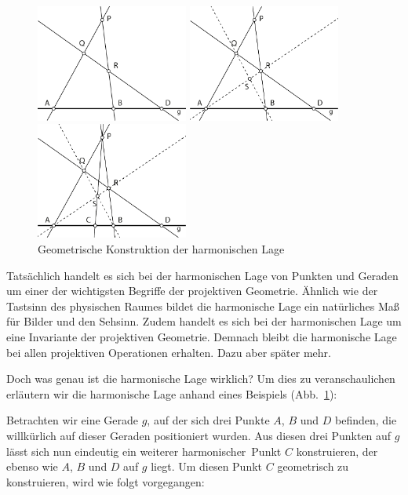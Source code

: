 \documentclass[12pt,a4paper]{article}
\begin{document}
\begin{figure}
\centering
\includegraphics[width=5cm]{Bilder/herleitung1.png}

\vspace{0.5cm}
\centering
\includegraphics[width=5cm]{Bilder/herleitung2.png}

\vspace{0.5cm}
\centering
\includegraphics[width=5cm]{Bilder/herleitung3.png}
\caption{Geometrische Konstruktion der harmonischen Lage}
\label{fig:Herleitung}
\end{figure}

Tatsächlich handelt es sich bei der harmonischen Lage von Punkten und Geraden um einer der wichtigsten Begriffe der projektiven Geometrie. Ähnlich wie der Tastsinn des physischen Raumes bildet die harmonische Lage ein natürliches Maß für Bilder und den Sehsinn. Zudem handelt es sich bei der harmonischen Lage um eine Invariante der projektiven Geometrie. Demnach bleibt die harmonische Lage bei allen projektiven Operationen erhalten. Dazu aber später mehr.

Doch was genau ist die harmonische Lage wirklich? Um dies zu veranschaulichen erläutern wir die harmonische Lage anhand eines Beispiels (Abb.~\ref{fig:Herleitung}):

Betrachten wir eine Gerade $g$, auf der sich drei Punkte $A$, $B$ und $D$ befinden, die willkürlich auf dieser Geraden positioniert wurden. Aus diesen drei Punkten auf $g$ lässt sich nun eindeutig ein weiterer \glqq harmonischer\grqq ~Punkt $C$ konstruieren, der ebenso wie $A$, $B$ und $D$ auf $g$ liegt. Um diesen Punkt $C$ geometrisch zu konstruieren, wird wie folgt vorgegangen:
\end{document}
